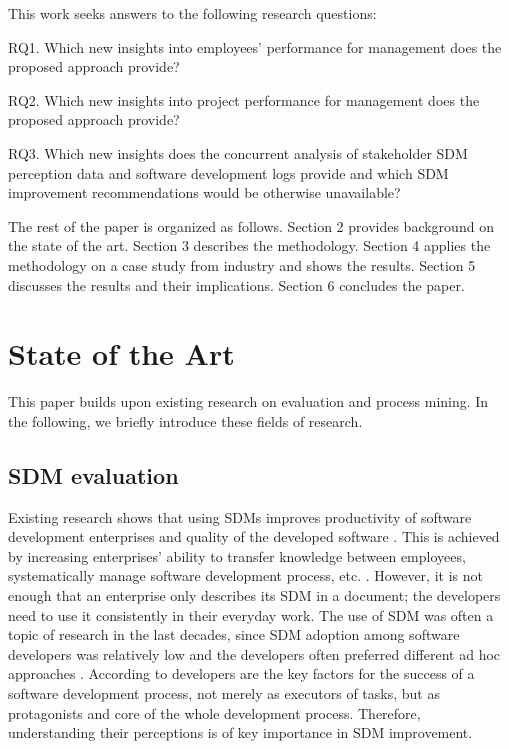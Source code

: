 This work seeks answers to the following research questions:

\begin{inparadesc}
	\item[RQ1.] Which new insights into employees’ performance for management does the proposed approach provide?
	
	\item[RQ2.] Which new insights into project performance for management does the proposed approach provide?
	
	\item[RQ3.] Which new insights does the concurrent analysis of stakeholder SDM perception data and software development logs provide and which SDM improvement recommendations would be otherwise unavailable?
	 
\end{inparadesc}


The rest of the paper is organized as follows. Section 2 provides background on the state of the art. Section 3 describes the methodology. Section 4 applies the methodology on a case study from industry and shows the results. Section 5 discusses the results and their implications. Section 6 concludes the paper.

\section{State of the Art}

This paper builds upon existing research on  evaluation and process mining. In the following, we briefly introduce these fields of research. 

\subsection{SDM evaluation}
\label{subsec:sdm-sota}

Existing research shows that using SDMs improves productivity of software development enterprises and quality of the developed software \citep{DBLP:journals/infsof/Bass16,DBLP:journals/re/ZdravkovicSG15,DBLP:journals/access/TuapeHKPK21}. This is achieved by increasing enterprises’ ability to transfer knowledge between employees, systematically manage software development process, etc. \citep{avison2006information,DBLP:journals/iam/Fitzgerald98,hovelja2015exploring,DBLP:journals/tse/RiemenschneiderHD02}. However, it is not enough that an enterprise only describes its SDM in a document; the developers need to use it consistently in their everyday work. The use of SDM was often a topic of research in the last decades, since SDM adoption among software developers was relatively low and the developers often preferred different ad hoc approaches \citep{DBLP:journals/software/Aaen03,DBLP:journals/isj/Fitzgerald96,DBLP:journals/iam/HuismanI06}. According to \cite{DBLP:journals/peerj-cs/DestefanisOCSMT16} developers are the key factors for the success of a software development process, not merely
as executors of tasks, but as protagonists and core of the whole development process. Therefore,
understanding their perceptions is of key importance in SDM improvement.

